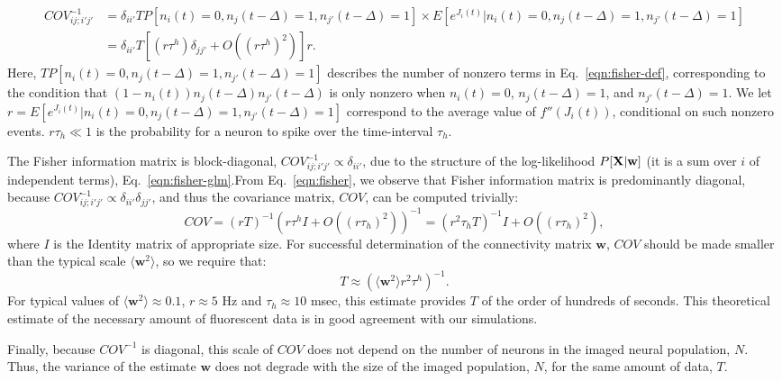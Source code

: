 \documentclass[aoas,preprint]{imsart}
\newcommand{\w}{w}
\newcommand{\bw}{\mathbf{\w}}
\newcommand{\bX}{{\bf X}}
\begin{document}
{\begin{align}
COV^{-1}_{ij;i'j'}
&=\delta_{ii'} T P[n_i(t)=0, n_j(t-\Delta)=1, n_{j'}(t-\Delta)=1]%
\times E[e^{J_i(t)}|n_i(t)=0, n_j(t-\Delta)=1, n_{j'}(t-\Delta)=1] \nonumber \\
&= \delta_{ii'}T\left[(r \tau^h)\delta_{jj'}+O((r \tau^h)^2)\right]r.
\end{align}
Here, $TP[n_i(t)=0, n_j(t-\Delta)=1, n_{j'}(t-\Delta)=1]$ describes the number of nonzero
terms in Eq.~\eqref{eqn:fisher-def}, corresponding to the condition that
$(1-n_i(t))n_{j}(t-\Delta)n_{j'}(t-\Delta)$ is only nonzero when
$n_i(t)=0$, $n_j(t-\Delta)=1$, and $n_{j'}(t-\Delta)=1$.  We let $r=E[e^{J_i(t)}|n_i(t)=0, n_j(t-\Delta)=1, n_{j'}(t-\Delta)=1]$  correspond to the average value of $f''(J_i(t))$, conditional on such nonzero events.  $r\tau_h \ll 1$ is the probability for a neuron to spike over the time-interval $\tau_h$.

The Fisher information matrix is block-diagonal, $COV^{-1}_{ij;i'j'} \propto \delta_{ii'}$, due to the structure of the log-likelihood $P[\bX | \bw]$ (it is a sum over $i$ of independent terms), Eq.~\eqref{eqn:fisher-glm}.From Eq.~\eqref{eqn:fisher}, we observe that Fisher information matrix is predominantly diagonal, because $COV^{-1}_{ij;i'j'} \propto \delta_{ii'}\delta_{jj'}$, and thus the covariance matrix, $COV$, can be computed trivially:
\begin{equation}
COV = (rT)^{-1} (r \tau^h I + O((r \tau_h)^2))^{-1} = (r^2 \tau_h T)^{-1} I + O((r \tau_h)^2),
\end{equation}
\noindent where $I$ is the Identity matrix of appropriate size.  For successful determination of the connectivity matrix $\bw$, $COV$ should be made smaller than the typical scale $\langle \bw^2\rangle$, so we require that:
\begin{equation}
T \approx (\langle \bw^2 \rangle r^2  \tau^h)^{-1}.
\end{equation}
For typical values of $\langle\bw^2\rangle\approx 0.1$, $r\approx 5$ Hz and $ \tau_h \approx 10$ msec, this estimate provides $T$ of the order of hundreds of seconds. This theoretical estimate of the necessary amount of fluorescent data is in good agreement with our simulations.

Finally, because $COV^{-1}$ is diagonal, this scale of $COV$ does not depend on the number of neurons in the imaged neural population, $N$. Thus, the variance of the estimate $\bw$ does not degrade with the size of the imaged population, $N$, for the same amount of data, $T$.

}
\end{document}
